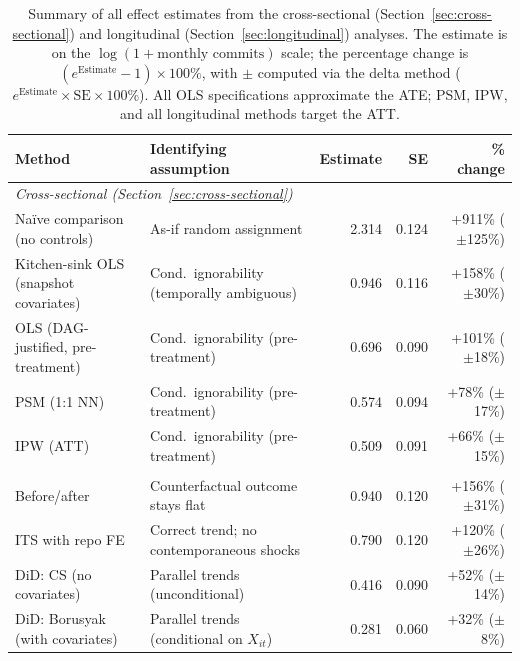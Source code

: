 \begin{table}[t]
\centering
\caption{Summary of all effect estimates from the cross-sectional (Section~\ref{sec:cross-sectional}) and longitudinal (Section~\ref{sec:longitudinal}) analyses.
The estimate is on the $\log(1 + \text{monthly commits})$ scale; the percentage change is $(e^{\text{Estimate}} - 1) \times 100\%$, with $\pm$ computed via the delta method ($e^{\text{Estimate}} \times \text{SE} \times 100\%$).
All OLS specifications approximate the ATE; PSM, IPW, and all longitudinal methods target the ATT.}
\label{tab:all-estimates}
\footnotesize
\setlength{\tabcolsep}{4pt}
\begin{tabularx}{\linewidth}{@{} p{4.6cm} X r r r @{}}
\toprule
Method & Identifying assumption & Estimate & SE & \% change \\
\midrule
\multicolumn{5}{l}{\emph{Cross-sectional (Section~\ref{sec:cross-sectional})}} \\
Na\"ive comparison (no controls) & As-if random assignment & 2.314 & 0.124 & +911\% ($\pm$125\%) \\
Kitchen-sink OLS (snapshot covariates) & Cond.\ ignorability (temporally ambiguous) & 0.946 & 0.116 & +158\% ($\pm$30\%) \\
OLS (DAG-justified, pre-treatment) & Cond.\ ignorability (pre-treatment) & 0.696 & 0.090 & +101\% ($\pm$18\%) \\
PSM (1:1 NN) & Cond.\ ignorability (pre-treatment) & 0.574 & 0.094 & +78\% ($\pm$17\%) \\
IPW (ATT) & Cond.\ ignorability (pre-treatment) & 0.509 & 0.091 & +66\% ($\pm$15\%) \\
\addlinespace
\multicolumn{5}{l}{\emph{Longitudinal (Section~\ref{sec:longitudinal})}} \\
Before/after & Counterfactual outcome stays flat & 0.940 & 0.120 & +156\% ($\pm$31\%) \\
ITS with repo FE & Correct trend; no contemporaneous shocks & 0.790 & 0.120 & +120\% ($\pm$26\%) \\
DiD: CS (no covariates) & Parallel trends (unconditional) & 0.416 & 0.090 & +52\% ($\pm$14\%) \\
DiD: Borusyak (with covariates) & Parallel trends (conditional on $X_{it}$) & 0.281 & 0.060 & +32\% ($\pm$8\%) \\
\bottomrule
\end{tabularx}
\end{table}

